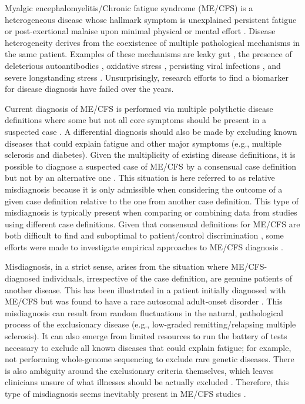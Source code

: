 Myalgic encephalomyelitis/Chronic fatigue syndrome (ME/CFS) is a heterogeneous disease whose hallmark symptom is unexplained persistent fatigue \citep{fukuda1994ChronicFatigue} or post-exertional malaise upon minimal physical or mental effort \citep{carruthers2003MyalgicEncephalomyelitis}. Disease heterogeneity derives from the coexistence of multiple pathological mechanisms in the same patient. Examples of these mechanisms are leaky gut \citep{konig2022GutMicrobiome}, the presence of deleterious autoantibodies \citep{wirth2020UnifyingHypothesis}, oxidative stress \citep{castro-marrero2013CouldMitochondrial, wood2021RoleMitochondria}, persisting viral infections \citep{rasa2018ChronicViral, sepulveda2019MyalgicEncephalomyelitis}, and severe longstanding stress \citep{rivera2019MyalgicEncephalomyelitis}. Unsurprisingly, research efforts to find a biomarker for disease diagnosis have failed over the years.

Current diagnosis of ME/CFS is performed via multiple polythetic disease definitions where some but not all core symptoms should be present in a suspected case \citep{smith2014DiagnosisTreatment}. A differential diagnosis should also be made by excluding known diseases that could explain fatigue and other major symptoms (e.g., multiple sclerosis and diabetes). Given the multiplicity of existing disease definitions, it is possible to diagnose a suspected case of ME/CFS by a consensual case definition but not by an alternative one \citep{malato2021Statisticalchallenges}. This situation is here referred to as relative misdiagnosis because it is only admissible when considering the outcome of a given case definition relative to the one from another case definition. This type of misdiagnosis is typically present when comparing or combining data from studies using different case definitions. Given that consensual definitions for ME/CFS are both difficult to find and suboptimal to patient/control discrimination \citep{jason2014ExaminingCase}, some efforts were made to investigate empirical approaches to ME/CFS diagnosis \citep{reeves2005ChronicFatigue, jason2015ComparingContrasting, conroy2023EvaluatingCase}.

Misdiagnosis, in a strict sense, arises from the situation where ME/CFS-diagnosed individuals, irrespective of the case definition, are genuine patients of another disease. This has been illustrated in a patient initially diagnosed with ME/CFS but was found to have a rare autosomal adult-onset disorder \citep{brown2021MECFS}. This misdiagnosis can result from random fluctuations in the natural, pathological process of the exclusionary disease (e.g., low-graded remitting/relapsing multiple sclerosis). It can also emerge from limited resources to run the battery of tests necessary to exclude all known diseases that could explain fatigue; for example, not performing whole-genome sequencing to exclude rare genetic diseases. There is also ambiguity around the exclusionary criteria themselves, which leaves clinicians unsure of what illnesses should be actually excluded \citep{jason2023EstablishingConsensus}. Therefore, this type of misdiagnosis seems inevitably present in ME/CFS studies \citep{nacul2019HowHave}.

